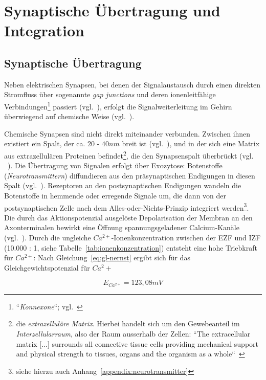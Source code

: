 {\section{Synaptische Übertragung und Integration}


\subsection{Synaptische Übertragung}\label{sec:synaptischeuebertragung}
Neben elektrischen Synapsen, bei denen der Signalaustausch durch einen direkten Stromfluss über sogenannte \textit{gap junctions} und deren ionenleitfähige Verbindungen\footnote{
 ``\textit{Konnexone}``; vgl.~\cite[50]{SD07}
} passiert (vgl.~\cite[119]{BCP18}), erfolgt die Signalweiterleitung im Gehirn überwiegend auf chemische Weise (vgl.~\cite[121 ff.]{BCP18}).

Chemische Synapsen sind nicht direkt miteinander verbunden. 
Zwischen ihnen existiert ein Spalt, der ca. $20$ - $40 nm$ breit ist (vgl.~\cite[184]{KSJ+13}), und in der sich eine Matrix aus extrazellulären Proteinen befindet\footnote{
 die \textit{extrazelluläre Matrix}. Hierbei handelt sich um den Gewebeanteil im \textit{Interzellularraum}, also der Raum ausserhalb der Zellen: ``The extracellular matrix {[...]} surrounds all connective tissue cells providing mechanical support and physical strength to tissues, organs and the organism as a whole``~\cite[3]{AHH+98}
}, die den Synapsenspalt überbrückt (vgl. ~\cite[122]{BCP18}).
Die Übertragung von Signalen erfolgt über Exozytose: Botenstoffe (\textit{Neurotransmittern}) diffundieren aus den präsynaptischen Endigungen in diesen Spalt (vgl.~\cite[122]{BCP18}). Rezeptoren an den postsynaptischen Endigungen wandeln die Botenstoffe in hemmende oder erregende Signale um, die dann von der postsynaptischen Zelle nach dem Alles-oder-Nichts-Prinzip integriert werden\footnote{siehe hierzu auch Anhang~\ref{appendix:neurotransmitter}}.\\

Die durch das Aktionspotenzial ausgelöste Depolarisation der Membran an den Axonterminalen bewirkt eine Öffnung spannungsgeladener Calcium-Kanäle (vgl.~\cite[184]{KSJ+13}).
Durch die ungleiche $Ca^{2+}$-Ionenkonzentration zwischen der EZF und IZF (10.000 : 1, siehe Tabelle~\ref{tab:ionenkonzentration}) entsteht eine hohe Triebkraft für $Ca^{2+}$: Nach Gleichung~\ref{eq:gl-nernst} ergibt sich für das Gleichgewichtspotenzial für $Ca^2+$

\begin{equation}
 E_{Ca^{2+}} = 123,08 mV
 \label{eq:gl-eqca2}
\end{equation}


}
